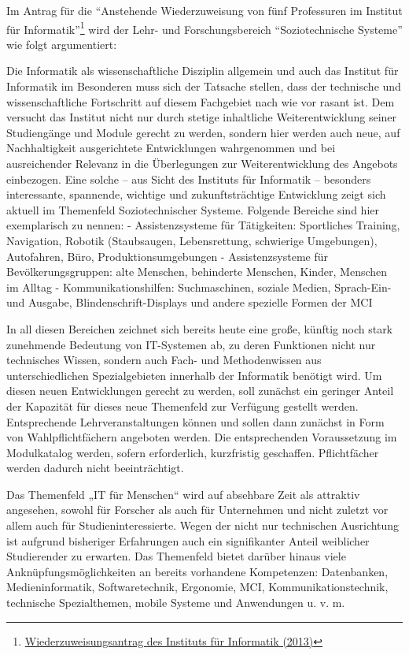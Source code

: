 Im Antrag für die ``Anstehende Wiederzuweisung von fünf Professuren im
Institut für Informatik''\footnote{\href{https://th-koeln.github.io/mi-2017/anhaenge/inst-AntragWiederzuweisung_Motivation_2013.pdf}{Wiederzuweisungsantrag
  des Instituts für Informatik (2013)}} wird der Lehr- und
Forschungsbereich ``Soziotechnische Systeme'' wie folgt argumentiert:

\begin{siderules}
Die Informatik als wissenschaftliche Disziplin allgemein und auch das
Institut für Informatik im Besonderen muss sich der Tatsache stellen,
dass der technische und wissenschaftliche Fortschritt auf diesem
Fachgebiet nach wie vor rasant ist. Dem versucht das Institut nicht nur
durch stetige inhaltliche Weiterentwicklung seiner Studiengänge und
Module gerecht zu werden, sondern hier werden auch neue, auf
Nachhaltigkeit ausgerichtete Entwicklungen wahrgenommen und bei
ausreichender Relevanz in die Überlegungen zur Weiterentwicklung des
Angebots einbezogen. Eine solche -- aus Sicht des Instituts für
Informatik -- besonders interessante, spannende, wichtige und
zukunftsträchtige Entwicklung zeigt sich aktuell im Themenfeld
Soziotechnischer Systeme. Folgende Bereiche sind hier exemplarisch zu
nennen: - Assistenzsysteme für Tätigkeiten: Sportliches Training,
Navigation, Robotik (Staubsaugen, Lebensrettung, schwierige Umgebungen),
Autofahren, Büro, Produktionsumgebungen - Assistenzsysteme für
Bevölkerungsgruppen: alte Menschen, behinderte Menschen, Kinder,
Menschen im Alltag - Kommunikationshilfen: Suchmaschinen, soziale
Medien, Sprach-Ein- und Ausgabe, Blindenschrift-Displays und andere
spezielle Formen der MCI

In all diesen Bereichen zeichnet sich bereits heute eine große, künftig
noch stark zunehmende Bedeutung von IT-Systemen ab, zu deren Funktionen
nicht nur technisches Wissen, sondern auch Fach- und Methodenwissen aus
unterschiedlichen Spezialgebieten innerhalb der Informatik benötigt
wird. Um diesen neuen Entwicklungen gerecht zu werden, soll zunächst ein
geringer Anteil der Kapazität für dieses neue Themenfeld zur Verfügung
gestellt werden. Entsprechende Lehrveranstaltungen können und sollen
dann zunächst in Form von Wahlpflichtfächern angeboten werden. Die
entsprechenden Voraussetzung im Modulkatalog werden, sofern
erforderlich, kurzfristig geschaffen. Pflichtfächer werden dadurch nicht
beeinträchtigt.

Das Themenfeld „IT für Menschen`` wird auf absehbare Zeit als attraktiv
angesehen, sowohl für Forscher als auch für Unternehmen und nicht
zuletzt vor allem auch für Studieninteressierte. Wegen der nicht nur
technischen Ausrichtung ist aufgrund bisheriger Erfahrungen auch ein
signifikanter Anteil weiblicher Studierender zu erwarten. Das Themenfeld
bietet darüber hinaus viele Anknüpfungsmöglichkeiten an bereits
vorhandene Kompetenzen: Datenbanken, Medieninformatik, Softwaretechnik,
Ergonomie, MCI, Kommunikationstechnik, technische Spezialthemen, mobile
Systeme und Anwendungen u. v. m.


\end{siderules}

